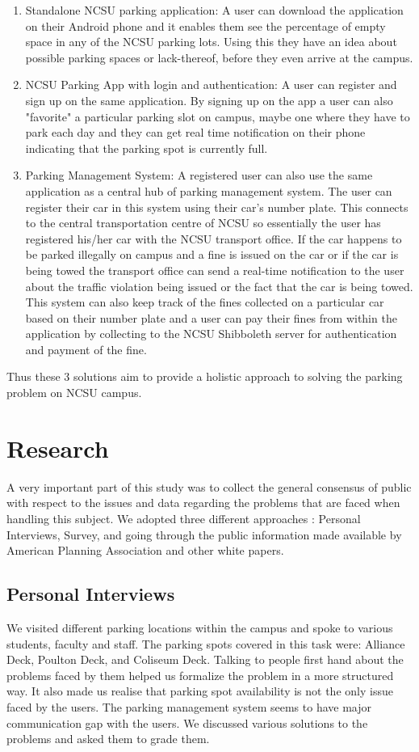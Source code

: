 \documentclass{acm_proc_article-sp}
\begin{document}
\begin{enumerate}
  \item Standalone NCSU parking application: A user can download the application on their Android phone and it enables them see the percentage of empty space in any of the NCSU parking lots. Using this they have an idea about possible parking spaces or lack-thereof, before they even arrive at the campus.
  \item NCSU Parking App with login and authentication: A user can register and sign up on the same application. By signing up on the app a user can also "favorite" a particular parking slot on campus, maybe one where they have to park each day and they can get real time notification on their phone indicating that the parking spot is currently full.
  \item  Parking Management System: A registered user can also use the same application as a central hub of parking management system. The user can register their car in this system using their car's number plate. This connects to the central transportation centre of NCSU so essentially the user has registered his/her car with the NCSU transport office. If the car happens to be parked illegally on campus and a fine is issued on the car or if the car is being towed the transport office can send a real-time notification to the user about the traffic violation being issued or the fact that the car is being towed. This system can also keep track of the fines collected on a particular car based on their number plate and a user can pay their fines from within the application by collecting to the NCSU Shibboleth server for authentication and payment of the fine.
\end{enumerate}

Thus these 3 solutions aim to provide a holistic approach to solving the parking problem on NCSU campus.

\section{Research}
A very important part of this study was to collect the general consensus of public with respect to the issues and data regarding the problems that are faced when handling this subject. We adopted three different approaches : Personal Interviews, Survey, and going through the public information made available by American Planning Association\cite{APA} and other white papers.

\subsection{Personal Interviews}
We visited different parking locations within the campus and spoke to various students, faculty and staff. The parking spots covered in this task were: Alliance Deck, Poulton Deck, and Coliseum Deck. Talking to people first hand about the problems faced by them helped us formalize the problem in a more structured way. It also made us realise that parking spot availability is not the only issue faced by the users. The parking management system seems to have major communication gap with the users. We discussed various solutions to the problems and asked them to grade them. 
\end{document}
